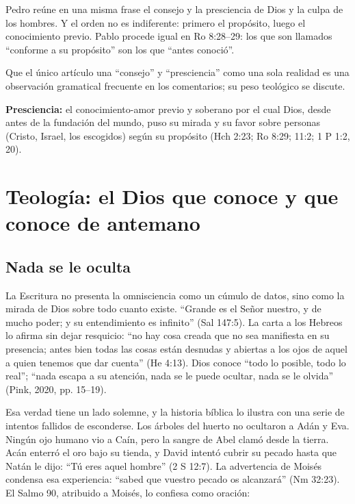 \documentclass[11pt,letterpaper]{article}
\begin{document}
Pedro reúne en una misma frase el consejo y la presciencia de Dios y la culpa de los hombres. Y el orden no es indiferente: primero el propósito, luego el conocimiento previo. Pablo procede igual en Ro 8:28--29: los que son llamados ``conforme a su propósito'' son los que ``antes conoció''.

\begin{nota}[Precisión]
Que el único artículo una ``consejo'' y ``presciencia'' como una sola realidad es una observación gramatical frecuente en los comentarios; su peso teológico se discute.
\end{nota}

\begin{tcolorbox}[colback=papiro,colframe=dorado,boxrule=1.2pt,arc=3pt]
\textbf{Presciencia:} el conocimiento-amor previo y soberano por el cual Dios, desde antes de la fundación del mundo, puso su mirada y su favor sobre personas (Cristo, Israel, los escogidos) según su propósito (Hch 2:23; Ro 8:29; 11:2; 1 P 1:2, 20).
\end{tcolorbox}

\section{Teología: el Dios que conoce y que conoce de antemano}

\subsection{Nada se le oculta}
La Escritura no presenta la omnisciencia como un cúmulo de datos, sino como la mirada de Dios sobre todo cuanto existe. ``Grande es el Señor nuestro, y de mucho poder; y su entendimiento es infinito'' (Sal 147:5). La carta a los Hebreos lo afirma sin dejar resquicio: ``no hay cosa creada que no sea manifiesta en su presencia; antes bien todas las cosas están desnudas y abiertas a los ojos de aquel a quien tenemos que dar cuenta'' (He 4:13). Dios conoce ``todo lo posible, todo lo real''; ``nada escapa a su atención, nada se le puede ocultar, nada se le olvida'' (Pink, 2020, pp. 15--19).

Esa verdad tiene un lado solemne, y la historia bíblica lo ilustra con una serie de intentos fallidos de esconderse. Los árboles del huerto no ocultaron a Adán y Eva. Ningún ojo humano vio a Caín, pero la sangre de Abel clamó desde la tierra. Acán enterró el oro bajo su tienda, y David intentó cubrir su pecado hasta que Natán le dijo: ``Tú eres aquel hombre'' (2 S 12:7). La advertencia de Moisés condensa esa experiencia: ``sabed que vuestro pecado os alcanzará'' (Nm 32:23). El Salmo 90, atribuido a Moisés, lo confiesa como oración:
\end{document}
